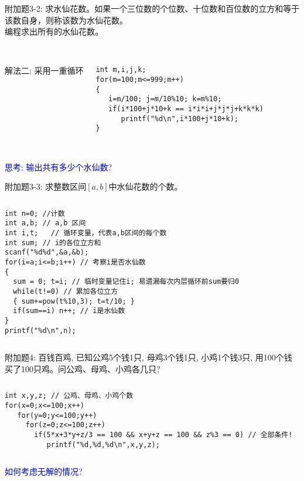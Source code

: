 \begin{frame}[fragile]
附加题3-2: 求水仙花数。如果一个三位数的个位数、十位数和百位数的立方和等于该数自身，则称该数为水仙花数。 \\
编程求出所有的水仙花数。\\
~\\ 
\pause
\begin{columns}
解法二: 采用一重循环
\begin{lstlisting}
int m,i,j,k; 
for(m=100;m<=999;m++)
{
   i=m/100; j=m/10%10; k=m%10;  
   if(i*100+j*10+k == i*i*i+j*j*j+k*k*k)  
      printf("%d\n",i*100+j*10+k);
}
\end{lstlisting}
\end{columns}
~\\
\pause
\textcolor{blue}{思考: 输出共有多少个水仙数?}
\end{frame}

\begin{frame}[fragile]
附加题3-3: 求整数区间$[a,b]$中水仙花数的个数。
\pause
\begin{columns}
\begin{lstlisting}
int n=0; //计数 
int a,b; // a,b 区间
int i,t;   // 循环变量，代表a,b区间的每个数
int sum; // i的各位立方和 
scanf("%d%d",&a,&b);
for(i=a;i<=b;i++) // 考察i是否水仙数
{  
  sum = 0; t=i; // 临时变量记住i; 易遗漏每次内层循环前sum要归0
  while(t!=0) // 累加各位立方 
  { sum+=pow(t%10,3); t=t/10; }
  if(sum==i) n++; // i是水仙数 
}
printf("%d\n",n);
\end{lstlisting}
\end{columns}
\end{frame}

\begin{frame}[fragile]
附加题4: 百钱百鸡, 已知公鸡5个钱1只, 母鸡3个钱1只, 小鸡1个钱3只, 用100个钱买了100只鸡。问公鸡、母鸡、小鸡各几只? 
\vspace{0.5cm}
\pause
\begin{columns}
\begin{lstlisting}
int x,y,z; // 公鸡、母鸡、小鸡个数
for(x=0;x<=100;x++) 
   for(y=0;y<=100;y++) 
     for(z=0;z<=100;z++) 
       if(5*x+3*y+z/3 == 100 && x+y+z == 100 && z%3 == 0) // 全部条件! 
          printf("%d,%d,%d\n",x,y,z);
\end{lstlisting}
\end{columns}
\vspace{0.5cm}
\pause
\textcolor{blue}{如何考虑无解的情况?}
\end{frame}

